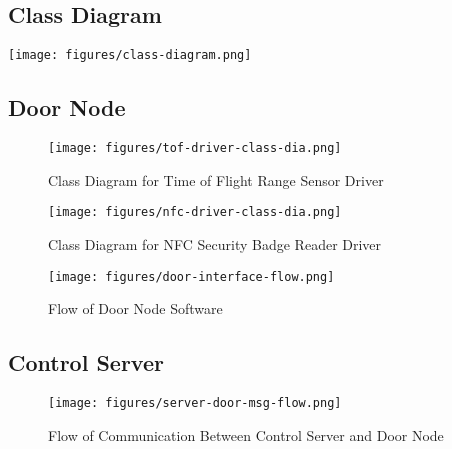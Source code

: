 \subsection{Class Diagram}
\texttt{[image: figures/class-diagram.png]}

\subsection{Door Node}

\begin{figure}[!htb]
\centering
\texttt{[image: figures/tof-driver-class-dia.png]}
\caption{Class Diagram for Time of Flight Range Sensor Driver}
\end{figure}

\begin{figure}[!htb]
\centering
\texttt{[image: figures/nfc-driver-class-dia.png]}
\caption{Class Diagram for NFC Security Badge Reader Driver}
\end{figure}

\begin{figure}[!htb]
\centering
\texttt{[image: figures/door-interface-flow.png]}
\caption{Flow of Door Node Software}
\end{figure}

\subsection{Control Server}

\begin{figure}[!htb]
\centering
\texttt{[image: figures/server-door-msg-flow.png]}
\caption{Flow of Communication Between Control Server and Door Node}
\end{figure}


